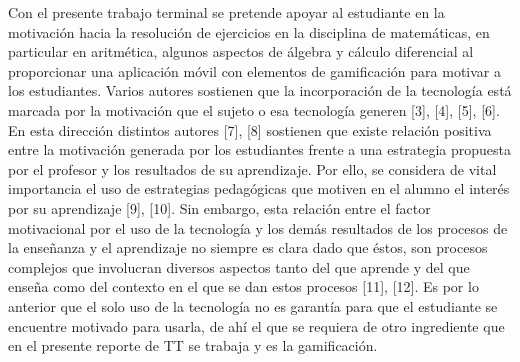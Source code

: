\documentclass{article}
\begin{document}
Con el presente trabajo terminal se pretende apoyar al estudiante en la motivación hacia la resolución de ejercicios en la disciplina de matemáticas, en particular en aritmética, algunos aspectos de álgebra y cálculo diferencial al proporcionar una aplicación móvil con elementos de gamificación para motivar a los estudiantes.   
Varios autores sostienen que la incorporación de la tecnología está marcada por la motivación que el sujeto o esa tecnología generen [3], [4], [5], [6]. En esta dirección distintos autores [7], [8] sostienen que existe relación positiva entre la motivación generada por los estudiantes frente a una estrategia propuesta por el profesor y los resultados de su aprendizaje. Por ello, se considera de vital importancia el uso de estrategias pedagógicas que motiven en el alumno el interés por su aprendizaje [9], [10]. Sin embargo, esta relación entre el factor motivacional por el uso de la tecnología y los demás resultados de los procesos de la enseñanza y el aprendizaje no siempre es clara dado que éstos, son procesos complejos que involucran diversos aspectos tanto del que aprende y del que enseña como del contexto en el que se dan estos procesos [11], [12]. Es por lo anterior que el solo uso de la tecnología no es garantía para que el estudiante se encuentre motivado para usarla, de ahí el que se requiera de otro ingrediente que en el presente reporte de TT se trabaja y es la gamificación.
\end{document}
